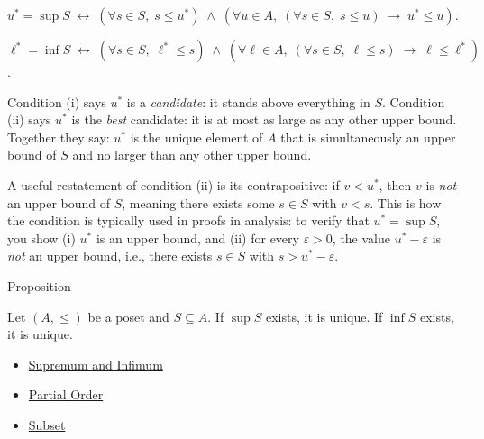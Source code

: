 \begin{remark*}
$u^* = \sup S \;\leftrightarrow\; (\forall s \in S,\; s \leq u^*) \;\wedge\;
(\forall u \in A,\; (\forall s \in S,\; s \leq u) \;\rightarrow\; u^* \leq u)$.

$\ell^* = \inf S \;\leftrightarrow\; (\forall s \in S,\; \ell^* \leq s) \;\wedge\;
(\forall \ell \in A,\; (\forall s \in S,\; \ell \leq s) \;\rightarrow\; \ell \leq \ell^*)$.
\end{remark*}

\begin{remark*}
\label{rem:sup-reading}
Condition (i) says $u^*$ is a \emph{candidate}: it stands above everything in
$S$. Condition (ii) says $u^*$ is the \emph{best} candidate: it is at most as
large as any other upper bound.  Together they say: $u^*$ is the unique
element of $A$ that is simultaneously an upper bound of $S$ and no larger than
any other upper bound.

A useful restatement of condition (ii) is its contrapositive: if $v < u^*$,
then $v$ is \emph{not} an upper bound of $S$, meaning there exists some
$s \in S$ with $v < s$.  This is how the condition is typically used in
proofs in analysis: to verify that $u^* = \sup S$, you show (i) $u^*$
is an upper bound, and (ii) for every $\varepsilon > 0$, the value
$u^* - \varepsilon$ is \emph{not} an upper bound, i.e., there exists
$s \in S$ with $s > u^* - \varepsilon$.
\end{remark*}


\begin{propositionbox}{Proposition}
\begin{proposition}
\label{prop:sup-unique}
Let $(A, \leq)$ be a poset and $S \subseteq A$.  If $\sup S$ exists, it is
unique.  If $\inf S$ exists, it is unique.
\end{proposition}
\end{propositionbox}

\begin{dependencies}
\begin{itemize}
  \item \hyperref[def:sup-inf]{Supremum and Infimum}
  \item \hyperref[def:partial-order]{Partial Order}
  \item \hyperref[def:subset]{Subset}
\end{itemize}
\end{dependencies}

